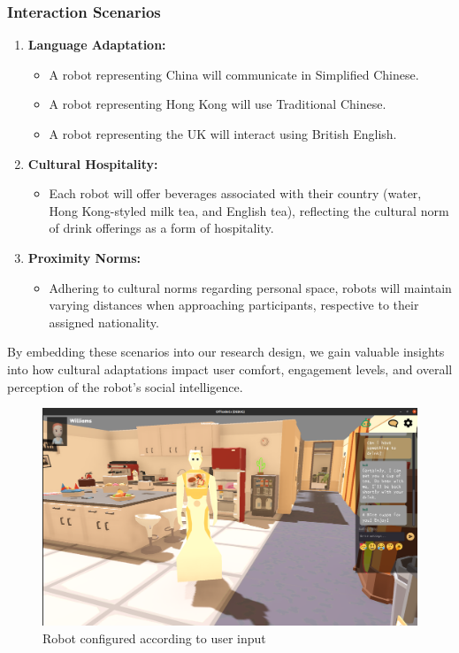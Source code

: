 \subsubsection{Interaction Scenarios}

\begin{enumerate}
    \item \textbf{Language Adaptation:}
    \begin{itemize}
        \item A robot representing China will communicate in Simplified Chinese.
        \item A robot representing Hong Kong will use Traditional Chinese.
        \item A robot representing the UK will interact using British English.
    \end{itemize}
    
    \item \textbf{Cultural Hospitality:}
    \begin{itemize}
        \item Each robot will offer beverages associated with their country (water, Hong Kong-styled milk tea, and English tea), reflecting the cultural norm of drink offerings as a form of hospitality.
    \end{itemize}
    
    \item \textbf{Proximity Norms:}
    \begin{itemize}
        \item Adhering to cultural norms regarding personal space, robots will maintain varying distances when approaching participants, respective to their assigned nationality.
    \end{itemize}
\end{enumerate}

By embedding these scenarios into our research design, we gain valuable insights into how cultural adaptations impact user comfort, engagement levels, and overall perception of the robot’s social intelligence.

\begin{figure}
    \begin{center}
        \noindent\includegraphics[width=\linewidth]{Chapter4/robot1.png}  
        \caption{Robot configured according to user input}
        \label{fig:figure1}
    \end{center}
\end{figure}

